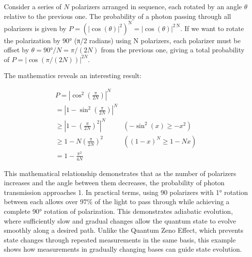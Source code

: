 \documentclass[
  a4paper,
]{book}
\begin{document}
Consider a series of \(N\) polarizers arranged in sequence, each rotated
by an angle \(\theta\) relative to the previous one. The probability of
a photon passing through all polarizers is given by
\(P=\left(|\cos (\theta)|^2\right)^{\mathrm{N}}=|\cos (\theta)|^{2 \mathrm{~N}}\).
If we want to rotate the polarization by 90° (π/2 radians) using N
polarizers, each polarizer must be offset by \(\theta=90°/N=\pi/(2N)\)
from the previous one, giving a total probability of
\(P=|\cos (\pi/(2N))|^{2N}\).

The mathematics reveals an interesting result:

\[
\begin{array}{ll}
P=\left|\cos ^2\left(\frac{\pi}{2 N}\right)\right|^N & \\
=\left|1-\sin ^2\left(\frac{\pi}{2 N}\right)\right|^N & \\
\geq\left|1-\left(\frac{\pi}{2 N}\right)^2\right|^N & \left(-\sin ^2(x) \geq-x^2\right) \\
\geq 1-N\left(\frac{\pi}{2 N}\right)^2 & \left((1-x)^N \geq 1-N x\right) \\
=1-\frac{\pi^2}{4 N}
\end{array}
\]

This mathematical relationship demonstrates that as the number of
polarizers increases and the angle between them decreases, the
probability of photon transmission approaches 1. In practical terms,
using 90 polarizers with 1° rotation between each allows over 97\% of
the light to pass through while achieving a complete 90° rotation of
polarization. This demonstrates adiabatic evolution, where sufficiently
slow and gradual changes allow the quantum state to evolve smoothly
along a desired path. Unlike the Quantum Zeno Effect, which prevents
state changes through repeated measurements in the same basis, this
example shows how measurements in gradually changing bases can guide
state evolution.
\end{document}
